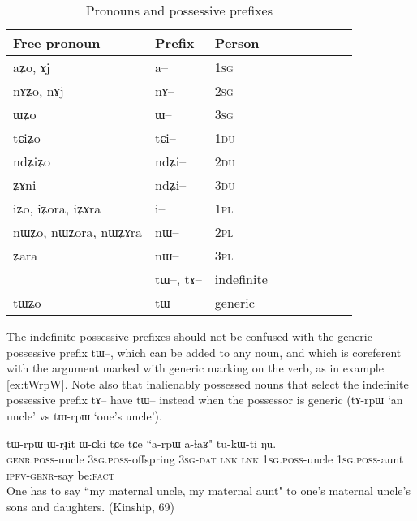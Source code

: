 \documentclass[oldfontcommands,oneside,a4paper,11pt]{article}
\newcommand{\ipa}[1]{{\phon #1}} %
\begin{document}
\begin{table}[H] \centering
\caption{Pronouns and possessive prefixes }\label{tab:pronoun}
\begin{tabular}{lllllllll} 
\toprule
 Free pronoun & Prefix & Person\\
\midrule
 \ipa{aʑo},    \ipa{ɤj} &	\ipa{a--}  &		1\textsc{sg} \\
\ipa{nɤʑo},  \ipa{nɤj} &	\ipa{nɤ--}  &			2\textsc{sg}\\
\ipa{ɯʑo}  &	\ipa{ɯ--}  &			3\textsc{sg}\\
\midrule
\ipa{tɕiʑo}  &	\ipa{tɕi--}  &			1\textsc{du} \\
\ipa{ndʑiʑo}  &	\ipa{ndʑi--}  &		2\textsc{du} \\	
\ipa{ʑɤni}  &	\ipa{ndʑi--}  &		3\textsc{du} \\	
\midrule
\ipa{iʑo}, \ipa{iʑora},   \ipa{iʑɤra}   &	\ipa{i--}  &			1\textsc{pl} \\
\ipa{nɯʑo}, \ipa{nɯʑora},   \ipa{nɯʑɤra}  &	\ipa{nɯ--}  &			2\textsc{pl} \\
\ipa{ʑara}  &	\ipa{nɯ--}  &			3\textsc{pl} \\
\midrule
&  \ipa{tɯ--},  \ipa{tɤ--} & indefinite \\
\ipa{tɯʑo} & \ipa{tɯ--}   &  generic\\
\bottomrule
\end{tabular}
\end{table}

The indefinite possessive prefixes should not be confused with the generic possessive prefix \ipa{tɯ--}, which can be added to any noun, and which is coreferent with the argument marked with generic marking on the verb, as in example \ref{ex:tWrpW}. Note also that inalienably possessed nouns that select the indefinite possessive prefix \ipa{tɤ--} have \ipa{tɯ--} instead when the possessor is generic (\ipa{tɤ-rpɯ} `an uncle' vs \ipa{tɯ-rpɯ} `one's uncle').

\begin{exe}
\ex \label{ex:tWrpW}
\gll
 \ipa{tɯ-rpɯ} 	\ipa{ɯ-rɟit} 	\ipa{ɯ-ɕki} 	\ipa{tɕe} 	\ipa{tɕe} 	``\ipa{a-rpɯ} \ipa{a-ɬaʁ}" 	\ipa{tu-kɯ-ti} 	\ipa{ŋu.} \\
\textsc{genr.poss}-uncle \textsc{3sg.poss}-offspring \textsc{3sg-dat} \textsc{lnk} \textsc{lnk} \textsc{1sg.poss}-uncle \textsc{1sg.poss}-aunt \textsc{ipfv-genr}-say  be:\textsc{fact} \\
\glt One has to say ``my maternal uncle, my maternal aunt" to one's maternal uncle's sons and daughters. (Kinship, 69)
\end{exe}
\end{document}
